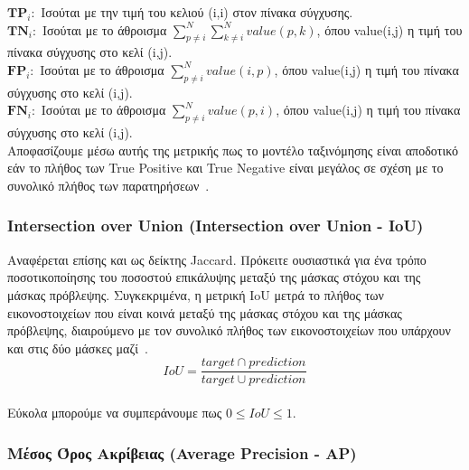 \documentclass[12pt]{article}
\numberwithin{equation}{section}
\begin{document}
\noindent $\mathbf{TP}_i:$ Ισούται με την τιμή του κελιού (i,i) στον πίνακα σύγχυσης. \\

\noindent $\mathbf{TN}_i:$ Ισούται με το άθροισμα $\sum_{p \neq i}^{N} \sum_{k \neq i}^{N} value(p,k)$, όπου value(i,j) η τιμή του πίνακα σύγχυσης στο κελί (i,j). \\

\noindent $\mathbf{FP}_i:$ Ισούται με το άθροισμα $\sum_{p \neq i}^{N} value(i,p)$, όπου value(i,j) η τιμή του πίνακα σύγχυσης στο κελί (i,j).\\

\noindent $\mathbf{FN}_i:$ Ισούται με το άθροισμα $\sum_{p \neq i}^{N} value(p,i)$, όπου value(i,j) η τιμή του πίνακα σύγχυσης στο κελί (i,j). \\




\noindent Αποφασίζουμε μέσω αυτής της μετρικής πως το μοντέλο ταξινόμησης είναι αποδοτικό εάν το πλήθος των True Positive και True Negative είναι μεγάλος σε σχέση με το συνολικό πλήθος των παρατηρήσεων~\cite{bhandari2025confusion}. 


\subsubsection{Intersection over Union (Intersection over Union - IoU)}

Αναφέρεται επίσης και ως δείκτης Jaccard. Πρόκειτε ουσιαστικά για ένα τρόπο ποσοτικοποίησης του ποσοστού επικάλυψης μεταξύ της μάσκας στόχου και της μάσκας πρόβλεψης. Συγκεκριμένα, η μετρική IoU μετρά το πλήθος των εικονοστοιχείων που είναι κοινά μεταξύ της μάσκας στόχου και της μάσκας πρόβλεψης, διαιρούμενο με τον συνολικό πλήθος των εικονοστοιχείων που υπάρχουν και στις δύο μάσκες μαζί~\cite{elharrouss2021panopticsegmentationreview}. \\

\begin{equation}
    IoU = \frac{target \cap prediction}{target \cup prediction}
\end{equation}
\\
Εύκολα μπορούμε να συμπεράνουμε πως \(0 \leq IoU \leq 1\).\\

\subsubsection{Μέσος Όρος Ακρίβειας (Average Precision - AP)}
\end{document}

